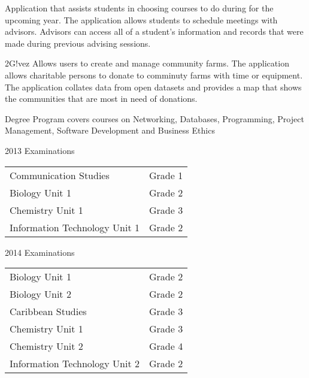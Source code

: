 \documentclass[10pt,a4paper]{altacv}
\begin{document}
\divider

Application that assists students in choosing courses to do during for the upcoming year. The application allows 
students to schedule meetings with advisors. Advisors can access all of a student's information and records that were made
during previous advising sessions.\\

\divider

2G!vez Allows users to create and manage community farms. The application allows charitable persons to donate to comminuty farms with time or equipment. The application collates data from open datasets and provides a map that shows the communities that are most in need of donations.\\
\medskip

\clearpage



Degree Program covers courses on Networking, Databases, Programming, Project Management, Software Development and Business Ethics


\divider

2013 Examinations

\medskip
\begin{tabular}{ l c }
Communication Studies & Grade 1\\
Biology Unit 1 & Grade 2\\
Chemistry Unit 1 & Grade 3\\
Information Technology Unit 1 & Grade 2
\end{tabular}
\medskip

2014 Examinations

\medskip
\begin{tabular}{ l c }
Biology Unit 1 &  Grade 2\\
Biology Unit 2 & Grade 2\\
Caribbean Studies & Grade 3\\
Chemistry Unit 1 & Grade 3\\
Chemistry Unit 2 & Grade 4\\
Information Technology Unit 2 & Grade 2 
\end{tabular}
\end{document}
